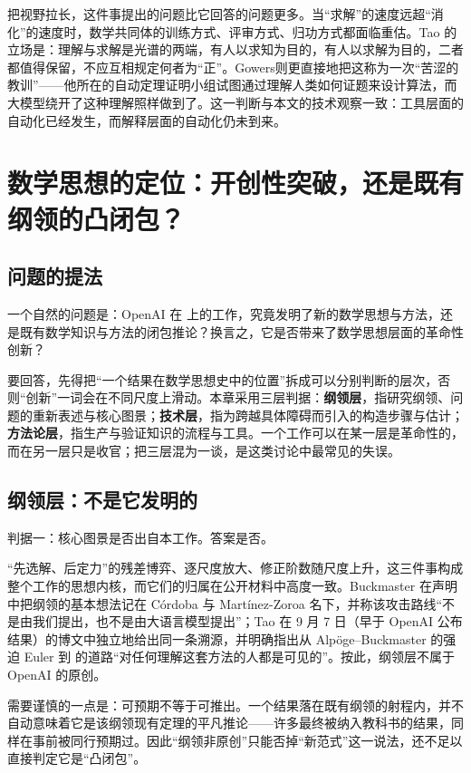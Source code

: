把视野拉长，这件事提出的问题比它回答的问题更多。当“求解”的速度远超“消化”的速度时，数学共同体的训练方式、评审方式、归功方式都面临重估。Tao 的立场是：理解与求解是光谱的两端，有人以求知为目的，有人以求解为目的，二者都值得保留，不应互相规定何者为“正”。Gowers\cite{gowers}则更直接地把这称为一次“苦涩的教训”——他所在的自动定理证明小组试图通过理解人类如何证题来设计算法，而大模型绕开了这种理解照样做到了。这一判断与本文的技术观察一致：工具层面的自动化已经发生，而解释层面的自动化仍未到来。

\section{数学思想的定位：开创性突破，还是既有纲领的凸闭包？}

\subsection{问题的提法}

一个自然的问题是：OpenAI 在 \NS{} 上的工作，究竟发明了新的数学思想与方法，还是既有数学知识与方法的闭包推论？换言之，它是否带来了数学思想层面的革命性创新？

要回答，先得把“一个结果在数学思想史中的位置”拆成可以分别判断的层次，否则“创新”一词会在不同尺度上滑动。本章采用三层判据：\textbf{纲领层}，指研究纲领、问题的重新表述与核心图景；\textbf{技术层}，指为跨越具体障碍而引入的构造步骤与估计；\textbf{方法论层}，指生产与验证知识的流程与工具。一个工作可以在某一层是革命性的，而在另一层只是收官；把三层混为一谈，是这类讨论中最常见的失误。

\subsection{纲领层：不是它发明的}

判据一：核心图景是否出自本工作。答案是否。

“先选解、后定力”的残差博弈、逐尺度放大、修正阶数随尺度上升，这三件事构成整个工作的思想内核，而它们的归属在公开材料中高度一致。Buckmaster 在声明中把纲领的基本想法记在 Córdoba 与 Martínez-Zoroa 名下，并称该攻击路线“不是由我们提出，也不是由大语言模型提出”；Tao 在 9 月 7 日（早于 OpenAI 公布结果）的博文中独立地给出同一条溯源，并明确指出从 Alpöge--Buckmaster 的强迫 Euler 到 \NS{} 的道路“对任何理解这套方法的人都是可见的”。按此，纲领层不属于 OpenAI 的原创。

需要谨慎的一点是：可预期不等于可推出。一个结果落在既有纲领的射程内，并不自动意味着它是该纲领现有定理的平凡推论——许多最终被纳入教科书的结果，同样在事前被同行预期过。因此“纲领非原创”只能否掉“新范式”这一说法，还不足以直接判定它是“凸闭包”。

